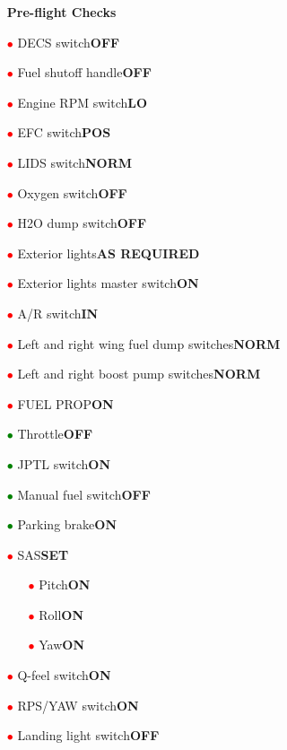 \documentclass[a4paper,12pt,dvipsnames]{letter}
\newcommand{\radio}[1]{\textcolor{blue}{#1}}
\newcommand{\button}[1]{\textbf{#1}}
\newcommand{\ri}{\textcolor{Red}{$\bullet$\;}}
\newcommand{\gi}{\textcolor{Green}{$\bullet$\;}}
\begin{document}
{\begin{itemize}
\end{itemize}
\newpage
\begin{itemize}
\item[] {\LARGE\textbf{Pre-flight Checks}}
\item[\ri] DECS switch\dotfill\button{OFF}
\item[\ri] Fuel shutoff handle\dotfill\button{OFF}
\item[\ri] Engine RPM switch\dotfill\button{LO}
\item[\ri] EFC switch\dotfill\button{POS}
\item[\ri] LIDS switch\dotfill\button{NORM}
\item[\ri] Oxygen switch\dotfill\button{OFF}
\item[\ri] H2O dump switch\dotfill\button{OFF}
\item[\ri] Exterior lights\dotfill\button{AS REQUIRED}
\item[\ri] Exterior lights master switch\dotfill\button{ON}
\item[\ri] A/R switch\dotfill\button{IN}
\item[\ri] Left and right wing fuel dump switches\dotfill\button{NORM}
\item[\ri] Left and right boost pump switches\dotfill\button{NORM}
\item[\ri] FUEL PROP\dotfill\button{ON}
\item[\gi] Throttle\dotfill\button{OFF}
\item[\gi] JPTL switch\dotfill\button{ON}
\item[\gi] Manual fuel switch\dotfill\button{OFF}
\item[\gi] Parking brake\dotfill\button{ON}
\item[\ri] SAS\dotfill\button{SET}
\begin{itemize}
 \item[\ri] Pitch\dotfill\button{ON}
 \item[\ri] Roll\dotfill\button{ON}
 \item[\ri] Yaw\dotfill\button{ON}
\end{itemize}
\item[\ri] Q-feel switch\dotfill\button{ON}
\item[\ri] RPS/YAW switch\dotfill\button{ON}
\item[\ri] Landing light switch\dotfill\button{OFF}

\end{itemize}}
\end{document}
